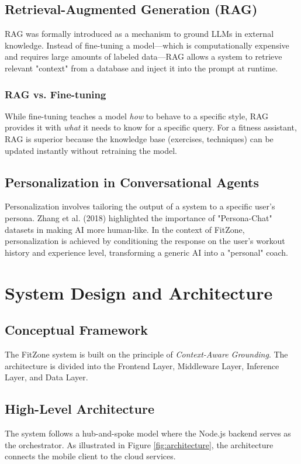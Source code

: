 \documentclass[12pt,a4paper]{report}
\begin{document}
\section{Retrieval-Augmented Generation (RAG)}
RAG was formally introduced as a mechanism to ground LLMs in external knowledge. Instead of fine-tuning a model—which is computationally expensive and requires large amounts of labeled data—RAG allows a system to retrieve relevant "context" from a database and inject it into the prompt at runtime.
\subsection{RAG vs. Fine-tuning}
While fine-tuning teaches a model \textit{how} to behave to a specific style, RAG provides it with \textit{what} it needs to know for a specific query. For a fitness assistant, RAG is superior because the knowledge base (exercises, techniques) can be updated instantly without retraining the model.

\section{Personalization in Conversational Agents}
Personalization involves tailoring the output of a system to a specific user's persona. Zhang et al. (2018) highlighted the importance of "Persona-Chat" datasets in making AI more human-like. In the context of FitZone, personalization is achieved by conditioning the response on the user's workout history and experience level, transforming a generic AI into a "personal" coach.

\chapter{System Design and Architecture}

\section{Conceptual Framework}
The FitZone system is built on the principle of \textit{Context-Aware Grounding}. The architecture is divided into the Frontend Layer, Middleware Layer, Inference Layer, and Data Layer.

\section{High-Level Architecture}
The system follows a hub-and-spoke model where the Node.js backend serves as the orchestrator. As illustrated in Figure \ref{fig:architecture}, the architecture connects the mobile client to the cloud services.
\end{document}
